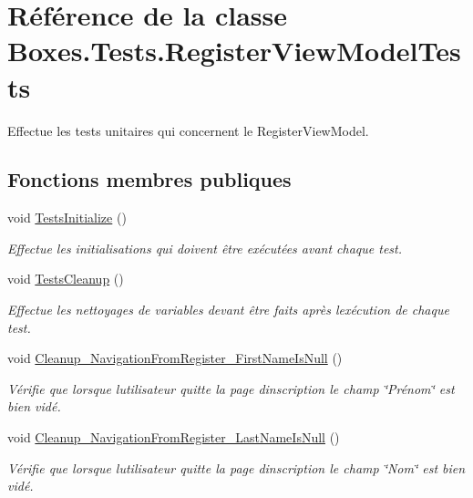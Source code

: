 \hypertarget{class_boxes_1_1_tests_1_1_register_view_model_tests}{}\section{Référence de la classe Boxes.\+Tests.\+Register\+View\+Model\+Tests}
\label{class_boxes_1_1_tests_1_1_register_view_model_tests}


Effectue les tests unitaires qui concernent le Register\+View\+Model.  


\subsection*{Fonctions membres publiques}
\begin{DoxyCompactItemize}
\item 
void \hyperlink{class_boxes_1_1_tests_1_1_register_view_model_tests_ac533616780d9eefa72a51d2025a3ac5a}{Tests\+Initialize} ()
\begin{DoxyCompactList}\small\item\em Effectue les initialisations qui doivent être exécutées avant chaque test. \end{DoxyCompactList}\item 
void \hyperlink{class_boxes_1_1_tests_1_1_register_view_model_tests_ae138690556afef1edc2de6b7aa73f409}{Tests\+Cleanup} ()
\begin{DoxyCompactList}\small\item\em Effectue les nettoyages de variables devant être faits après l\textquotesingle{}exécution de chaque test. \end{DoxyCompactList}\item 
void \hyperlink{class_boxes_1_1_tests_1_1_register_view_model_tests_a6542c339250306476f9a1717d65dc1f7}{Cleanup\+\_\+\+Navigation\+From\+Register\+\_\+\+First\+Name\+Is\+Null} ()
\begin{DoxyCompactList}\small\item\em Vérifie que lorsque l\textquotesingle{}utilisateur quitte la page d\textquotesingle{}inscription le champ \char`\"{}\+Prénom\char`\"{} est bien vidé. \end{DoxyCompactList}\item 
void \hyperlink{class_boxes_1_1_tests_1_1_register_view_model_tests_ab3157e3c320d70e32088078addab9413}{Cleanup\+\_\+\+Navigation\+From\+Register\+\_\+\+Last\+Name\+Is\+Null} ()
\begin{DoxyCompactList}\small\item\em Vérifie que lorsque l\textquotesingle{}utilisateur quitte la page d\textquotesingle{}inscription le champ \char`\"{}\+Nom\char`\"{} est bien vidé. \end{DoxyCompactList}\item 

\end{DoxyCompactItemize}
